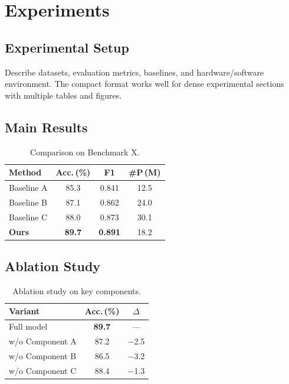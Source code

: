 \documentclass[10pt,a4paper]{article}
\begin{document}
\section{Experiments}
\label{sec:experiments}

\subsection{Experimental Setup}
\label{sec:setup}

Describe datasets, evaluation metrics, baselines, and hardware/software
environment. The compact format works well for dense experimental
sections with multiple tables and figures.

\subsection{Main Results}
\label{sec:results}

\begin{table}[H]
  \centering
  \caption{Comparison on Benchmark X.}
  \label{tab:main_results}
  \small
  \begin{tabular}{@{}lccc@{}}
    \toprule
    \textbf{\sffamily Method}
      & \textbf{\sffamily Acc.\,(\%)}
      & \textbf{\sffamily F1}
      & \textbf{\sffamily \#P\,(M)} \\
    \midrule
    Baseline A    & 85.3 & 0.841 & 12.5 \\
    Baseline B    & 87.1 & 0.862 & 24.0 \\
    Baseline C    & 88.0 & 0.873 & 30.1 \\
    \rowcolor{blue!8}
    \textbf{Ours} & \textbf{\color{jluRed}89.7}
                  & \textbf{\color{jluRed}0.891} & 18.2 \\
    \bottomrule
  \end{tabular}
\end{table}

\subsection{Ablation Study}
\label{sec:ablation}

\begin{table}[H]
  \centering
  \caption{Ablation study on key components.}
  \label{tab:ablation}
  \small
  \begin{tabular}{@{}lcc@{}}
    \toprule
    \textbf{\sffamily Variant} & \textbf{\sffamily Acc.\,(\%)} & \textbf{\sffamily $\Delta$} \\
    \midrule
    Full model           & \textbf{89.7} & ---    \\
    w/o Component A      & 87.2 & \color{jluRed}$-$2.5 \\
    w/o Component B      & 86.5 & \color{jluRed}$-$3.2 \\
    w/o Component C      & 88.4 & \color{jluRed}$-$1.3 \\
    \bottomrule
  \end{tabular}
\end{table}
\end{document}
